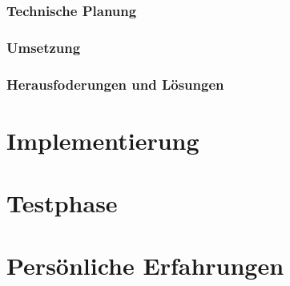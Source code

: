     \subsubsection{Technische Planung}

    \subsubsection{Umsetzung}

    \subsubsection{Herausfoderungen und Lösungen}

\section{Implementierung}

\section{Testphase}

\section{Persönliche Erfahrungen}
